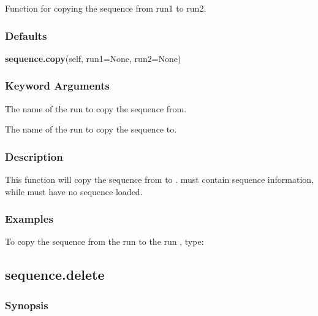 Function for copying the sequence from run1 to run2.



\subsubsection{Defaults}

\textsf{\textbf{sequence.copy}(self, run1=None, run2=None)}


\subsubsection{Keyword Arguments}

  The name of the run to copy the sequence from. 

  The name of the run to copy the sequence to. 




\subsubsection{Description}

This function will copy the sequence from  to .   must contain sequence information, while  must have no sequence loaded.



\subsubsection{Examples}

To copy the sequence from the run  to the run , type:






\newpage

\subsection{sequence.delete}


\subsubsection{Synopsis}

